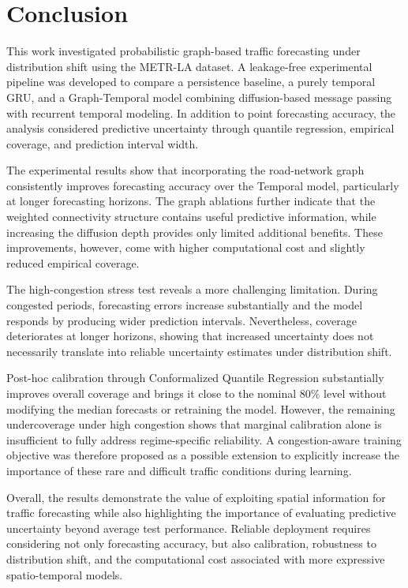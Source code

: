 \section{Conclusion}
\label{sec:conclusion}

This work investigated probabilistic graph-based traffic forecasting under
distribution shift using the METR-LA dataset. A leakage-free experimental
pipeline was developed to compare a persistence baseline, a purely temporal
GRU, and a Graph-Temporal model combining diffusion-based message passing with
recurrent temporal modeling. In addition to point forecasting accuracy, the
analysis considered predictive uncertainty through quantile regression,
empirical coverage, and prediction interval width.

The experimental results show that incorporating the road-network graph
consistently improves forecasting accuracy over the Temporal model,
particularly at longer forecasting horizons. The graph ablations further
indicate that the weighted connectivity structure contains useful predictive
information, while increasing the diffusion depth provides only limited
additional benefits. These improvements, however, come with higher
computational cost and slightly reduced empirical coverage.

The high-congestion stress test reveals a more challenging limitation.
During congested periods, forecasting errors increase substantially and the
model responds by producing wider prediction intervals. Nevertheless,
coverage deteriorates at longer horizons, showing that increased uncertainty
does not necessarily translate into reliable uncertainty estimates under
distribution shift.

Post-hoc calibration through Conformalized Quantile Regression substantially
improves overall coverage and brings it close to the nominal 80\% level
without modifying the median forecasts or retraining the model. However, the
remaining undercoverage under high congestion shows that marginal calibration
alone is insufficient to fully address regime-specific reliability. A
congestion-aware training objective was therefore proposed as a possible
extension to explicitly increase the importance of these rare and difficult
traffic conditions during learning.

Overall, the results demonstrate the value of exploiting spatial information
for traffic forecasting while also highlighting the importance of evaluating
predictive uncertainty beyond average test performance. Reliable deployment
requires considering not only forecasting accuracy, but also calibration,
robustness to distribution shift, and the computational cost associated with
more expressive spatio-temporal models.